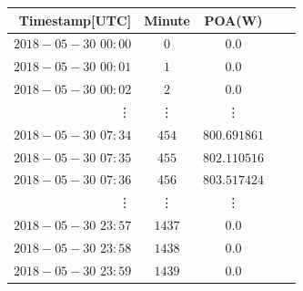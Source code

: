 
\begin{table}[h]

\centering

\begin{tabular}{r|cccc} \hline\hline

Timestamp[UTC] & Minute & POA(W) \\ \hline
$2018-05-30$ $00:00$ &  $0$ & $0.0$\\
$2018-05-30$ $00:01$ &  $1$ & $0.0$\\
$2018-05-30$ $00:02$ &  $2$ & $0.0$\\
\vdots & \vdots & \vdots \\
$2018-05-30$ $ 07:34$ & $454$ & $800.691861$\\
$2018-05-30 $ $07:35$ & $455$ & $802.110516$\\
$2018-05-30 $ $07:36$ & $456$ & $803.517424$\\
\vdots & \vdots & \vdots \\
$2018-05-30$ $ 23:57$ & $1437$ & $0.0$\\
$2018-05-30 $ $23:58$ & $1438$ & $0.0$\\
$2018-05-30 $ $23:59$ & $1439$ & $0.0$\\

\hline\hline
\end{tabular}
\label{table_poa_simulated_format}
\end{table}


